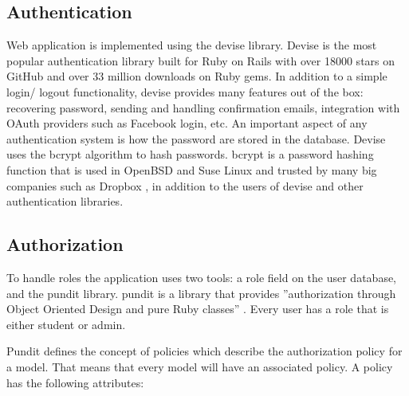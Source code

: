 \subsection{Authentication}
Web application is implemented using the devise library. Devise is the most popular authentication library built for Ruby on Rails with over 18000 stars on GitHub and over 33 million downloads on Ruby gems. In addition to a simple login/ logout functionality, devise provides many features out of the box: recovering password, sending and handling confirmation emails, integration with OAuth providers such as Facebook login, etc. An important aspect of any authentication system is how the password are stored in the database. Devise uses the bcrypt algorithm to hash passwords. bcrypt is a password hashing function \citep{wiki:bcrypt} that is used in OpenBSD and Suse Linux and trusted by many big companies such as Dropbox \citep{dropbox:authentication}, in addition to the users of devise and other authentication libraries.

\subsection{Authorization}
To handle roles the application uses two tools: a role field on the user database, and the pundit library. pundit is a library that provides ''authorization through Object Oriented Design and pure Ruby classes'' \citep{github:pundit}. Every user has a role that is either student or admin.

Pundit defines the concept of policies which describe the authorization policy for a model. That means that every model will have an associated policy. A policy has the following attributes:

